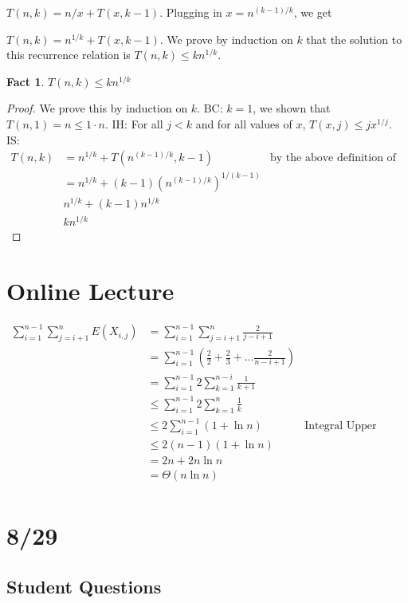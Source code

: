\documentclass{article}
\newtheorem{fact}{Fact}
\begin{document}
$T(n,k) = n/x + T(x, k-1)$.  Plugging in $x = n^{(k-1)/k}$, we get 

$T(n,k) = n^{1/k} + T(x, k-1)$.  We prove by induction on $k$ that the solution to this recurrence relation is $T(n,k) \leq k n^{1/k}$.

\begin{fact}
    $T(n,k) \leq k n^{1/k}$
\end{fact}
\begin{proof}
    We prove this by induction on $k$.
    BC: $k=1$, we shown that $T(n,1) = n \leq 1\cdot n$.
    IH: For all $j<k$ and for all values of $x$, $T(x,j) \leq j x^{1/j}$.
    IS: 
\begin{align*}
    T(n,k) & = n^{1/k} + T(n^{(k-1)/k},k-1) & \text{by the above definition of the recurrence}\\
           & = n^{1/k} + (k-1) (n^{(k-1)/k})^{1/(k-1)} \\
           & n^{1/k} + (k-1) n^{1/k} \\
           & k n^{1/k}
\end{align*}
\end{proof}


\section{Online Lecture}

\begin{align*}
    \sum_{i=1}^{n-1} \sum_{j=i+1}^n E(X_{i,j}) & = \sum_{i=1}^{n-1} \sum_{j=i+1}^n \frac{2}{j-i+1}\\
     & = \sum_{i=1}^{n-1}  (\frac{2}{2} + \frac{2}{3} + \ldots \frac{2}{n-i+1}) \\
    & = \sum_{i=1}^{n-1} 2 \sum_{k=1}^{n-i} \frac{1}{k+1} \\
    & \leq \sum_{i=1}^{n-1} 2 \sum_{k=1}^{n} \frac{1}{k} \\
    & \leq 2 \sum_{i=1}^{n-1} (1 + \ln n) & \text{Integral Upper bound}\\
    & \leq 2 (n-1) (1 + \ln n)\\
    & = 2 n + 2 n \ln n\\
    & = \Theta(n \ln n)\\
\end{align*}


\section{8/29}

\subsection{Student Questions}
\end{document}
